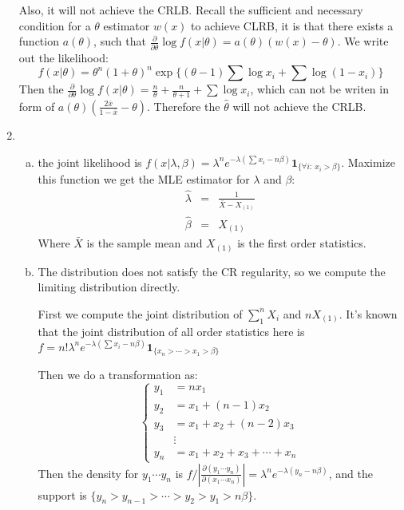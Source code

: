 \documentclass[12pt]{article}
\newcommand{\pard}[1]{\frac{\partial}{\partial #1}}
\begin{document}
\begin{enumerate}
    Also, it will not achieve the CRLB. Recall the sufficient and necessary condition for a $\theta$ estimator $w(x)$ to achieve CLRB, it is that there exists a function $a(\theta)$, such that $\pard{\theta} \log{f(x|\theta)} = a(\theta)(w(x) - \theta)$.
    We write out the likelihood:
    $$f(x|\theta) = \theta^n(1+\theta)^n \exp\{(\theta - 1) \sum \log{x_i} + \sum \log(1 - x_i)\}$$
    Then the $\pard{\theta} \log{f(x|\theta)} = \frac{n}{\theta} + \frac{n}{\theta + 1} + \sum \log{x_i}$, which can not be writen in form of $a(\theta)(\frac{2\bar{x}}{1-\bar{x}} - \theta)$. Therefore the $\hat{\theta}$ will not achieve the CRLB.

    \item
    \begin{enumerate}[(a)]
        \item
        the joint likelihood is $f(x|\lambda, \beta) = \lambda^n e^{-\lambda (\sum x_i - n \beta)} \bm{1}_{\{\forall i: \ x_i > \beta\}}$.
        Maximize this function we get the MLE estimator for $\lambda$ and $\beta$:
        \begin{eqnarray}
            \hat{\lambda} &=& \frac{1}{\bar{X} - X_{(1)}} \\
            \hat{\beta} &=& X_{(1)}
        \end{eqnarray}
        Where $\bar{X}$ is the sample mean and $X_{(1)}$ is the first order statistics.

        \item
        The distribution does not satisfy the CR regularity, so we compute the limiting distribution directly.

        First we compute the joint distribution of $\sum_1^n X_i$ and $n X_{(1)}$.
        It's known that the joint distribution of all order statistics here is $f = n! \lambda^n e^{-\lambda (\sum x_i - n\beta)} \bm{1}_{\{x_n > \cdots > x_1 > \beta\}}$

        Then we do a transformation as: 
        $$\left\{ \begin{aligned}
            y_1 &= n x_1 \\
            y_2 &= x_1 + (n-1)x_2 \\
            y_3 &= x_1 + x_2 + (n-2)x_3 \\
            &\vdots \\
            y_n &= x_1 + x_2 + x_3 + \cdots + x_n
        \end{aligned}\right.$$
        Then the density for $y_1 \cdots y_n$ is $f / |\frac{\partial (y_1 \cdots y_n)}{\partial (x_1 \cdots x_n)}| = \lambda^n e^{-\lambda (y_n - n\beta)}$, and the support is $\{y_n > y_{n-1} > \cdots > y_2 > y_1 > n\beta \}$.


\end{enumerate}
\end{enumerate}
\end{document}
